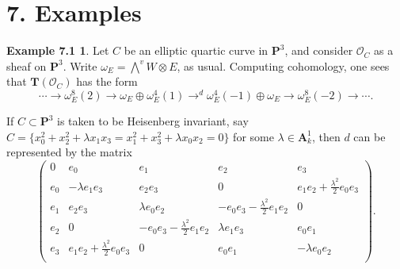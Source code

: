 \documentclass{tran-l}
\newcommand{\myP}{\mathbf{P}}
\newcommand{\TT}{\mathbf{T}}
\theoremstyle{plain}
\theoremstyle{remark}
\theoremstyle{definition}
\newtheorem*{definition3}{Example 7.1}
\begin{document}
\section*{7. Examples}\begin{definition3}
Let $C$ be an elliptic quartic
curve in $\myP ^{3}$, and consider $\mathcal{O} _{C}$ as
a sheaf on $\myP ^{3}$. Write $\omega _{E}=\bigwedge ^{v}W\otimes E$, as usual.
Computing cohomology,
one sees that $\TT (\mathcal{O} _{C})$ has the form
\begin{equation*}\cdots \longrightarrow \omega _{E}^{8}(2)
\longrightarrow \omega _{E} \oplus \omega _{E}^{4}(1)
\longrightarrow ^{d}
\omega _{E}^{4}(-1)\oplus \omega _{E}
\longrightarrow \omega _{E}^{8}(-2)
\longrightarrow \cdots. \end{equation*}

If $C \subset \myP ^{3}$ is taken to be Heisenberg invariant, say
$C = \{ x_{0}^{2}+x_{2}^{2}
+\lambda x_{1}x_{3}=x_{1}^{2}+x_{3}^{2}+\lambda x_{0}x_{2} = 0 \}$
for some $\lambda \in \mathbf{A} ^{1}_{k}$, then $d$ can be represented
by the matrix
\begin{equation*}\begin{pmatrix}0 &e_{0} &         e_{1}   &     e_{2}   &    e_{3}         \\
 e_{0} &-\lambda e_{1}e_{3}  & e_{2}e_{3}  & 0 & e_{1}e_{2}+{\frac{\lambda ^{2} }{2}}e_{0}e_{3} \\
 e_{1}  &e_{2}e_{3} & \lambda e_{0}e_{2}    &  -e_{0}e_{3}-{\frac{\lambda ^{2} }{2}} e_{1}e_{2} & 0 \\
 e_{2} &0       & -e_{0}e_{3}-{\frac{\lambda ^{2} }{2}} e_{1}e_{2} & \lambda e_{1}e_{3}  &  e_{0}e_{1}
\\
 e_{3} &e_{1}e_{2}+{\frac{\lambda ^{2} }{2}}e_{0}e_{3}& 0 & e_{0}e_{1} & -\lambda e_{0}e_{2} \\
\end{pmatrix}
.\end{equation*}
\end{definition3}
\end{document}
